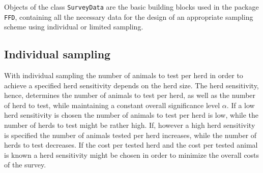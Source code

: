 \documentclass[nojss]{jss}
\begin{document}
\begin{Schunk}
\end{Schunk}

  Objects of the class \texttt{SurveyData} are the basic building blocks used in the package \texttt{FFD}, containing all the necessary data for the design of an appropriate sampling scheme using individual or limited sampling.


\subsection{Individual sampling} \label{subsec:ind-sampling}

With individual sampling the number of animals to test per herd in order to achieve a specified herd sensitivity depends on the herd size. The herd sensitivity, hence, determines the number of animals to test per herd, as well as the number of herd to test, while maintaining a constant overall significance level $\alpha$. If a low herd sensitivity is chosen the number of animals to test per herd is low, while the number of herds to test might be rather high. If, however a high herd sensitivity is specified the number of animals tested per herd increases, while the number of herds to test decreases. If the cost per tested herd and the cost per tested animal is known a herd sensitivity might be chosen in order to minimize the overall costs of the survey.
\end{document}
